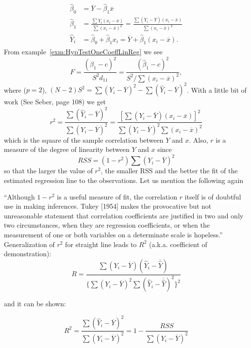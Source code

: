 \begin{gather} %
\begin{aligned}
\hat \beta_0 &= \overline Y - \hat \beta_1 \overline x \\ 
\hat \beta_1 &=  \frac{\sum Y_i (x_i-\overline x)}{\sum (x_i-\overline x)^2}= \frac{\sum (Y_i-\overline Y)(x_i -\overline x)}{\sum (x_i-\overline x)^2}\\ 
\hat Y_i &= \hat \beta_0 + \hat \beta_1 x_i = \overline Y + \hat \beta_1(x_i - \overline x).
\end{aligned}
\end{gather} 
\noindent From example~\ref{exm:HypTestOneCoeffLinReg}
we see
\[F = \frac{(\hat \beta_1 - c)^2}{S^2d_{11}} 
= \frac{(\hat \beta_1 - c)^2}{S^2/\sum (x_i - \overline x)^2},\]
where ($p=2$), $(N-2)S^2=\sum(Y_i - \overline Y)^2 - \sum(\hat Y_i - \overline Y)^2$.
With a little bit of work (See Seber, page 108)
we get 
\[
r^2 = \frac{\sum(\hat Y_i - \overline Y)^2}{\sum(Y_i - \overline Y)^2} 
= \frac{[\sum (Y_i - \overline Y)(x_i - \overline x)]^2}{\sum (Y_i - \overline Y)^2 \sum (x_i - \overline x)^2}
\]
which is the square of the sample 
correlation between $Y$ and $x$.
Also, $r$ is a measure of the degree of linearity 
between $Y$ and $x$ since
\[RSS = (1-r^2)\sum(Y_i - \overline Y)^2\]
so that the larger the value of $r^2$, the
smaller RSS and the better the fit of 
the estimated regression line to the observations.
Let us mention the following again

``Although $1 - r^2$ is a useful measure of fit, 
the correlation $r$ itself is of doubtful use in 
making inferences. Tukey [1954] makes the 
provocative but not unreasonable statement that 
correlation coefficients are justified in two 
and only two circumstances, when they 
are regression coefficients, 
or when the measurement of one or both 
variables on a determinate scale is hopeless.''\\

Generalization of $r^2$ for straight line leads to
$R^2$ (a.k.a. coefficient of demonstration):
\[R = \frac{\sum(Y_i - \overline Y)(\hat Y_i - \overline {\hat  Y})}{ \{ \sum(Y_i - \overline Y)^2 \sum(\hat Y_i - \overline {\hat  Y})^2\}^2}\]

and it can be shown:

\[R^2 = \frac{\sum (\hat Y_i - \overline Y)^2}{\sum (Y_i - \overline Y)^2} = 1 - \frac{RSS}{\sum (Y_i - \overline Y)^2}\]




